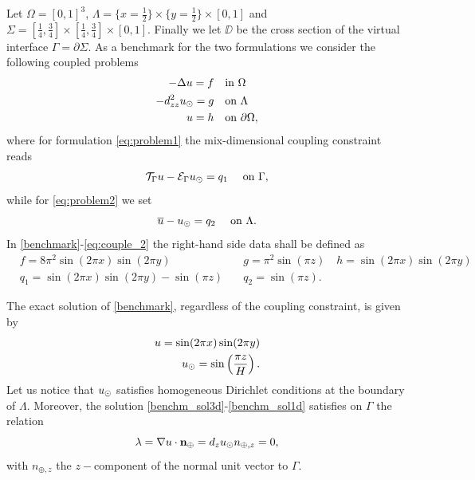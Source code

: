 \documentclass[r]{siamart171218}
\begin{document}
Let $\Omega=[0,1]^3$, $\Lambda=\{x=\tfrac{1}{2}\}\times \{y=\tfrac{1}{2}\} \times [0,1] $
and $\Sigma=[\tfrac{1}{4}, \tfrac{3}{4}]\times [\tfrac{1}{4}, \tfrac{3}{4}]\times [0, 1]$.
Finally we let $\DD$ be the cross section of the virtual interface $\Gamma=\partial \Sigma$.
As a benchmark for the two formulations we consider the following coupled problems
%
\begin{subequations}\label{benchmark}
\begin{align}
\label{benchm_3d}
-\Delta u=f \quad &\text{in $\Omega$}\\
\label{benchm_1d}
-d_{zz}^2 \ud =g \quad &\text{on $\Lambda$}\\
u=h \quad &\text{on $\partial \Omega$},
\end{align}
\end{subequations}
where for formulation \eqref{eq:problem1} the mix-dimensional coupling constraint reads
\begin{equation}
  \label{eq:couple_1}
\mathcal{T}_{\Gamma}u - \mathcal{E}_{\Gamma}\ud = q_1\quad\text{ on }\Gamma,
\end{equation}
while for \eqref{eq:problem2} we set
\begin{equation}
    \label{eq:couple_2}
\avrc{u} - \ud = q_2\quad\text{ on }\Lambda.
\end{equation}
%
In \eqref{benchmark}-\eqref{eq:couple_2} the right-hand side data shall be defined as 
\begin{eqnarray*}
  &f=8\pi ^2 \sin (2\pi x) \sin (2\pi y)\quad &g={\pi ^2}\sin \left({\pi z}\right)\quad h=\sin (2\pi x) \sin (2\pi y)\\
  &q_1=\sin (2\pi x) \sin (2\pi y) - \sin \left({\pi z}\right)\quad &q_2=\sin \left({\pi z}\right).
\end{eqnarray*}

The exact solution of \eqref{benchmark}, regardless of the coupling constraint,
is given by
%
\begin{eqnarray}
\label{benchm_sol3d}
u=\sin (2\pi x) \sin (2\pi y)\\
\label{benchm_sol1d}
\ud=\sin \left(\frac{\pi z}{H}\right).
\end{eqnarray}
%
Let us notice that $u_{\odot}$ satisfies homogeneous Dirichlet conditions at the boundary of $\Lambda$.
Moreover, the solution \eqref{benchm_sol3d}-\eqref{benchm_sol1d} satisfies on $\Gamma$ the relation
\begin{equation}\label{benchm_flux}
\lambda=\nabla u \cdot \textbf{n}_{\oplus}=d_z \ud n_{\oplus,z}=0,
\end{equation}
with $n_{\oplus,z}$ the $z-$component of the normal unit vector to $\Gamma$.
\end{document}
